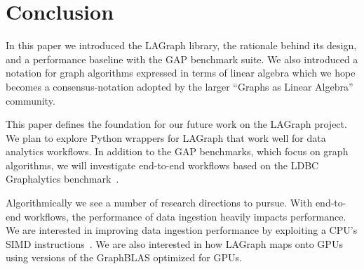 \section{Conclusion}
\label{sec:conclusion}

In this paper we introduced the LAGraph library, the rationale behind its design,  
and a performance baseline with the GAP benchmark suite.   We also introduced
a notation for graph algorithms expressed in terms of linear algebra which we hope becomes
a consensus-notation adopted by the 
larger ``Graphs as Linear Algebra'' community.

This paper defines the foundation for our future work on the LAGraph project.  
We plan to explore Python wrappers for LAGraph that work well for data analytics workflows.  
In addition to the GAP benchmarks, which focus on graph algorithms, we will  
investigate end-to-end workflows based on the LDBC Graphalytics benchmark~\cite{DBLP:journals/pvldb/IosupHNHPMCCSAT16}.

Algorithmically we see a number of research directions to pursue.   With end-to-end workflows, the performance
of data ingestion heavily impacts performance.  We are interested in improving data ingestion performance
by exploiting a CPU's SIMD instructions~\cite{DBLP:journals/vldb/LangdaleL19}.  We are also interested in how  
LAGraph maps onto GPUs using versions of the GraphBLAS optimized for GPUs.
